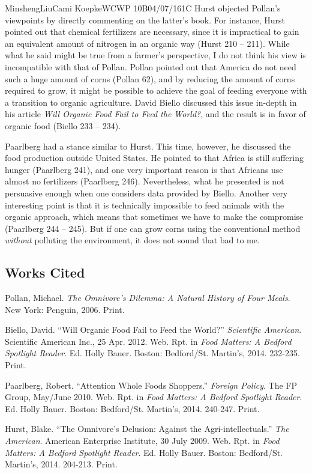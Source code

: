 \documentclass[12pt,letterpaper]{article}
\begin{document}
\begin{mla}{Minsheng}{Liu}{Cami Koepke}{WCWP 10B}{04/07/16}{1C}
Hurst objected Pollan's viewpoints by directly commenting on the
latter's book. For instance, Hurst pointed out that chemical fertilizers
are necessary, since it is impractical to gain an equivalent amount of
nitrogen in an organic way (Hurst 210 -- 211). While what he said might
be true from a farmer's perspective, I do not think his view is
incompatible with that of Pollan. Pollan pointed out that America do not
need such a huge amount of corns (Pollan 62), and by reducing the amount
of corns required to grow, it might be possible to achieve the goal of
feeding everyone with a transition to organic agriculture. David Biello
discussed this issue in-depth in his article \emph{Will Organic Food
Fail to Feed the World?}, and the result is in favor of organic food
(Biello 233 -- 234).

Paarlberg had a stance similar to Hurst. This time, however, he
discussed the food production outside United States. He pointed to that
Africa is still suffering hunger (Paarlberg 241), and one very important
reason is that Africans use almost no fertilizers (Paarlberg 246).
Nevertheless, what he presented is not persuasive enough when one
considers data provided by Biello. Another very interesting point is
that it is technically impossible to feed animals with the organic
approach, which means that sometimes we have to make the compromise
(Paarlberg 244 -- 245). But if one can grow corns using the conventional
method \emph{without} polluting the environment, it does not sound that
bad to me.

\subsection*{Works Cited}
\bibent Pollan, Michael. \textit{The Omnivore's Dilemma: A Natural History of Four Meals}. New York: Penguin, 2006. Print.

\bibent Biello, David. ``Will Organic Food Fail to Feed the World?'' \textit{Scientific American}. Scientific American Inc., 25 Apr. 2012. Web. Rpt. in \textit{Food Matters: A Bedford Spotlight Reader}. Ed. Holly Bauer. Boston: Bedford/St. Martin's, 2014. 232-235. Print.

\bibent Paarlberg, Robert. ``Attention Whole Foods Shoppers.'' \textit{Foreign Policy}. The FP Group, May/June 2010. Web. Rpt. in \textit{Food Matters: A Bedford Spotlight Reader}. Ed. Holly Bauer. Boston: Bedford/St. Martin’s, 2014. 240-247. Print.

\bibent Hurst, Blake. ``The Omnivore’s Delusion: Against the Agri-intellectuals.'' \textit{The American}. American Enterprise Institute, 30 July 2009. Web. Rpt. in \textit{Food Matters: A Bedford Spotlight Reader}. Ed. Holly Bauer. Boston: Bedford/St. Martin’s, 2014. 204-213. Print.


\end{mla}
\end{document}
